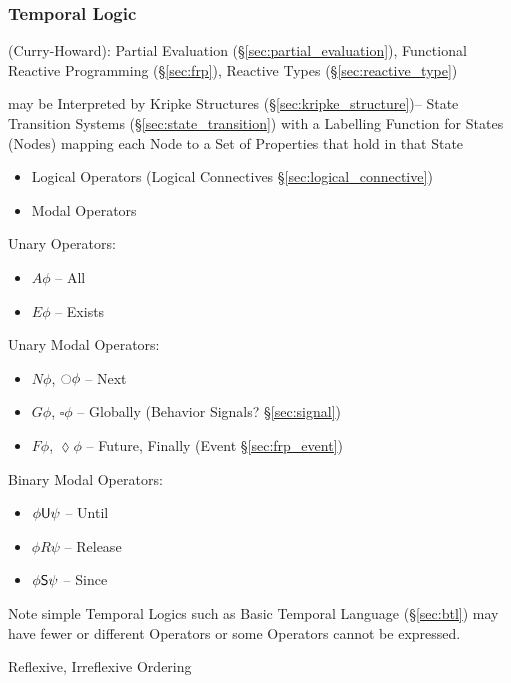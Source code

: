 \subsubsection{Temporal Logic}\label{sec:temporal_logic}

(Curry-Howard): Partial Evaluation (\S\ref{sec:partial_evaluation}),
Functional Reactive Programming (\S\ref{sec:frp}), Reactive Types
(\S\ref{sec:reactive_type})

may be Interpreted by Kripke Structures
(\S\ref{sec:kripke_structure})-- State Transition Systems
(\S\ref{sec:state_transition}) with a Labelling Function for States
(Nodes) mapping each Node to a Set of Properties that hold in that
State

\begin{itemize}
  \item Logical Operators (Logical Connectives
    \S\ref{sec:logical_connective})
  \item Modal Operators
\end{itemize}


Unary Operators:
\begin{itemize}
  \item $A\phi$ -- All
  \item $E\phi$ -- Exists
\end{itemize}

Unary Modal Operators:
\begin{itemize}
  \item $N\phi$, $\ocircle\phi$ -- Next
  \item $G\phi$, $\square\phi$ -- Globally (Behavior
    Signals? \S\ref{sec:signal}) %
  \item $F\phi$, $\lozenge\phi$ -- Future, Finally (Event
    \S\ref{sec:frp_event})
\end{itemize}

Binary Modal Operators:
\begin{itemize}
  \item $\phi \mathsf{U} \psi$ -- Until
  \item $\phi R \psi$ -- Release
  \item $\phi \mathsf{S} \psi$ -- Since
\end{itemize}

\fist Note simple Temporal Logics such as Basic Temporal Language
(\S\ref{sec:btl}) may have fewer or different Operators or some
Operators cannot be expressed.

Reflexive, Irreflexive Ordering


\asterism



